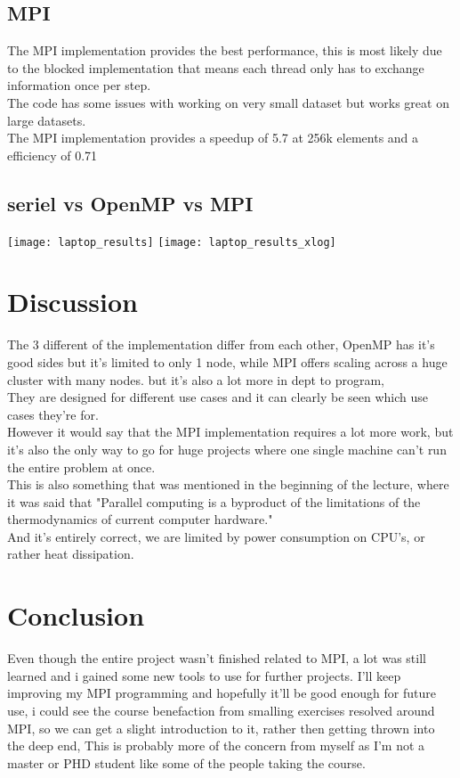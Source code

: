 \documentclass[a4paper,10pt,titlepage]{report}
\begin{document}
\subsection{MPI}
The MPI implementation provides the best performance, this is most likely due to the blocked implementation that means each thread only has to exchange information once per step. \\
The code has some issues with working on very small dataset but works great on large datasets.\\
The MPI implementation provides a speedup of 5.7 at 256k elements and a efficiency of 0.71


\subsection{seriel vs OpenMP vs MPI}
\texttt{[image: laptop\_results]}
\texttt{[image: laptop\_results\_xlog]}

\section{Discussion}
The 3 different of the implementation differ from each other, OpenMP has it's good sides but it's limited to only 1 node, while MPI offers scaling across a huge cluster with many nodes. but it's also a lot more in dept to program, \\
They are designed for different use cases and it can clearly be seen which use cases they're for. \\
However it would say that the MPI implementation requires a lot more work, but it's also the only way to go for huge projects where one single machine can't run the entire problem at once. \\
This is also something that was mentioned in the beginning of the lecture, where it was said that "Parallel computing is a byproduct of the limitations of the thermodynamics of current computer hardware." \\
And it's entirely correct, we are limited by power consumption on CPU's, or rather heat dissipation. \\

\section{Conclusion}
Even though the entire project wasn't finished related to MPI, a lot was still learned and i gained some new tools to use for further projects. I'll keep improving my MPI programming and hopefully it'll be good enough for future use, i could see the course benefaction from smalling exercises resolved around MPI, so we can get a slight introduction to it, rather then getting thrown into the deep end, This is probably more of the concern from myself as I'm not a master or PHD student like some of the people taking the course.
\newpage
\end{document}
